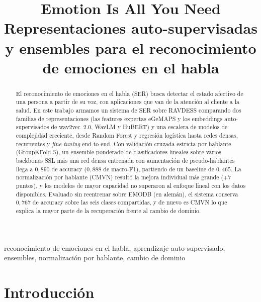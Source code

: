 \documentclass[conference]{IEEEtran}
\begin{document}
\title{Emotion Is All You Need\\
{\large\normalfont Representaciones auto-supervisadas y ensembles para el
reconocimiento de emociones en el habla}}

\author{
\and
{}
}

\maketitle

\begin{abstract}
El reconocimiento de emociones en el habla (SER) busca detectar el estado
afectivo de una persona a partir de su voz, con aplicaciones que van de la
atención al cliente a la salud. En este trabajo armamos un sistema de SER
sobre RAVDESS comparando dos familias de representaciones (las features
expertas eGeMAPS y los embeddings auto-supervisados de wav2vec~2.0, WavLM y
HuBERT) y una escalera de modelos de complejidad creciente, desde Random
Forest y regresión logística hasta redes densas, recurrentes y
\emph{fine-tuning} end-to-end. Con validación cruzada estricta por hablante
(GroupKFold-5), un ensemble ponderado de clasificadores lineales sobre
varios backbones SSL más una red densa entrenada con aumentación de
pseudo-hablantes llega a $0{,}890$ de accuracy ($0{,}888$ de macro-F1),
partiendo de un baseline de $0{,}465$. La normalización por hablante (CMVN)
resultó la mejora individual más grande ($+7$ puntos), y los modelos de
mayor capacidad no superaron al enfoque lineal con los datos disponibles.
Evaluado sin reentrenar sobre EMODB (en alemán), el sistema conserva
$0{,}767$ de accuracy sobre las seis clases compartidas, y de nuevo es CMVN
lo que explica la mayor parte de la recuperación frente al cambio de
dominio.
\end{abstract}

\begin{IEEEkeywords}
reconocimiento de emociones en el habla, aprendizaje auto-supervisado,
ensembles, normalización por hablante, cambio de dominio
\end{IEEEkeywords}

\section{Introducción}
\end{document}
